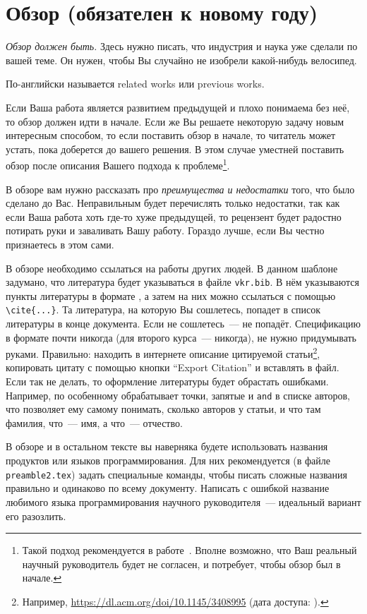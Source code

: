 
\section{Обзор (обязателен к новому году)}
\label{sec:relatedworks}
\emph{Обзор должен быть.} Здесь нужно писать, что индустрия и наука уже сделали по вашей теме. Он нужен, чтобы Вы случайно не изобрели какой-нибудь велосипед.

По-английски называется related works или previous works.

Если Ваша работа является развитием предыдущей и плохо понима\-ема без неё, то обзор должен идти в начале. Если же Вы решаете некоторую задачу новым интересным способом, то если поставить обзор в начале, то читатель может устать, пока доберется до вашего решения. В этом случае уместней поставить обзор после описания Вашего подхода к проблеме\footnote{Такой подход рекомендуется в работе~\cite{SPJGreatPaper}.
    Вполне возможно, что Ваш реальный научный руководитель будет не согласен, и потребует, чтобы обзор был в начале.}.

В обзоре вам нужно рассказать про \emph{преимущества и недостатки} того, что было сделано до Вас.
Неправильным будет перечислять только недостатки, так как если Ваша работа хоть где-то хуже предыдущей, то рецензент будет радостно потирать руки и заваливать Вашу работу.
Гораздо лучше, если Вы честно признаетесь в этом сами.

В обзоре необходимо ссылаться на работы других людей. В данном шаблоне задумано, что литература будет указываться в файле \verb=vkr.bib=. В нём указываются пункты литературы в формате \BibTeX{}, а затем на них можно ссылаться с помощью \verb=\cite{...}=. Та литература, на которую Вы сошлетесь, попадет в список литературы в конце документа. Если не сошлетесь~---  не попадёт. Спецификацию в формате \BibTeX{} почти никогда (для второго курса~--- никогда), не нужно придумывать руками. Правильно: находить в интернете описание цитируемой статьи\footnote{Например, \url{https://dl.acm.org/doi/10.1145/3408995} (дата доступа:   ).},
копировать цитату с помощью кнопки \foreignquote{english}{Export Citation} и вставлять в \BibTeX{} файл.
Если так не делать, то оформление литературы будет обрастать ошибками.
Например, \BibTeX{} по особенному обрабатывает точ\-ки, запятые и \verb=and= в списке авторов, что позволяет ему самому понимать, сколько авторов у статьи, и что там фамилия, что~--- имя, а что~--- отчество.

В обзоре и в остальном тексте вы наверняка будете использовать названия продуктов или языков программирования.
Для них рекоменду\-ется (в файле \verb=preamble2.tex=) за\-дать специальные команды, чтобы писать сложные названия правильно и одинаково по всему доку\-менту.
Написать с ошибкой  название любимого языка программирова\-ния науч\-ного руко\-водителя~--- идеальный вариант его разозлить.

